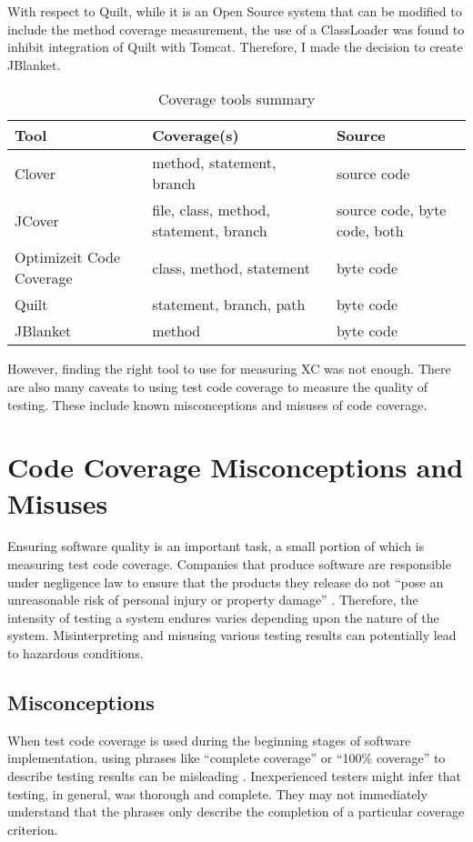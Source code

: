 With respect to Quilt, while it is an Open Source system that can be
modified to include the method coverage measurement, the use of a
ClassLoader was found to inhibit integration of Quilt with
Tomcat. Therefore, I made the decision to create JBlanket.

\begin{table}[htbp]
  \begin{center}
    \caption{Coverage tools summary}
    \begin{tabular}{|l|l|l|} \hline
      {\bf Tool} & {\bf Coverage(s)} & {\bf Source}\\ \hline
      Clover & method, statement, branch & source code\\ \hline
      JCover & file, class, method, statement, branch & source code, byte code, both\\ \hline
      Optimizeit Code Coverage & class, method, statement & byte code\\ \hline
      Quilt & statement, branch, path & byte code\\ \hline
      JBlanket & method & byte code\\ \hline
    \end{tabular}
  \end{center}
\end{table}

However, finding the right tool to use for measuring XC was not enough.
There are also many caveats to using test code coverage to measure the
quality of testing.  These include known misconceptions and misuses of code
coverage.
 
\section{Code Coverage Misconceptions and Misuses}
Ensuring software quality is an important task, a small portion of which is
measuring test code coverage.  Companies that produce software are
responsible under negligence law to ensure that the products they release
do not ``pose an unreasonable risk of personal injury or property damage''
\cite{Kaner:1995}.  Therefore, the intensity of testing a system endures
varies depending upon the nature of the system.  Misinterpreting and
misusing various testing results can potentially lead to hazardous
conditions.

\subsection{Misconceptions}
When test code coverage is used during the beginning stages of software
implementation, using phrases like ``complete coverage'' or ``100\%
coverage'' to describe testing results can be misleading \cite{Kaner:1995}.
Inexperienced testers might infer that testing, in general, was thorough
and complete.  They may not immediately understand that the phrases only
describe the completion of a particular coverage criterion.

